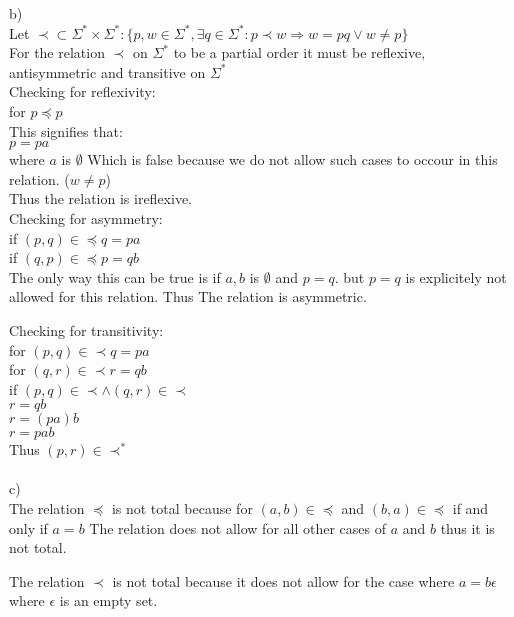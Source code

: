 \documentclass{article}
\begin{document}
    b)\\
    Let $\prec \subset \Sigma^* \times \Sigma^* : \{p, w \in \Sigma^*, \exists q \in \Sigma^* : p \prec w \Rightarrow  w = pq \lor w \neq p \}$\\
    For the relation $\prec$ on $\Sigma^*$ to be a partial order it must be reflexive, antisymmetric and transitive on $\Sigma^*$\\
    
    Checking for reflexivity:\\
    for $p \preceq p$\\
    This signifies that:\\
    $p = pa$\\
    where $a$ is $\emptyset$
    Which is false because we do not allow such cases to occour in this relation. ($w \neq p$)\\
    Thus the relation is ireflexive.\\

    Checking for asymmetry:\\

    if $(p, q) \in \preceq q = pa$\\
    if $(q, p) \in \preceq p = qb$\\

    The only way this can be true is if $a, b$ is $\emptyset$ and $p = q$.
    but $p = q$ is explicitely not allowed for this relation. Thus The relation is asymmetric.

    Checking for transitivity:\\

    for $(p, q) \in \prec q = pa$\\
    for $(q, r) \in \prec r = qb$\\
    if $(p, q) \in \prec \land (q, r) \in \prec$\\
    $r = qb$\\
    $r = (pa)b$\\
    $r = pab$\\
    Thus $(p, r) \in \prec^*$ 
	\\\\
    c)\\
    The relation $\preceq$ is not total because for $(a, b) \in \preceq$ and $(b, a) \in \preceq$ if and only if $a = b$
    The relation does not allow for all other cases of $a$ and $b$ thus it is not total.

    The relation $\prec$ is not total because it does not allow for the case where $a = b\epsilon$ where $\epsilon$ is an empty set.    
\end{document}
